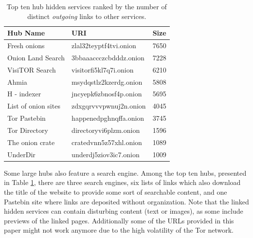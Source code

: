 \begin{table}[t]
    \begin{center}
        \caption{Top ten hub hidden services ranked by the number of distinct \emph{outgoing} links to other services.}
        \label{table:toptenout}
        \begin{tabular}{p{3cm} | p{3.5cm} | p{1cm}}
             \textbf{Hub Name} & \textbf{URI} & \textbf{Size} \\
             \hline
             \hline
            Fresh onions & zlal32teyptf4tvi.onion  &  7650\\
            \hline
            Onion Land Search & 3bbaaaccczcbdddz.onion  &  7228\\
            \hline
            VisiTOR Search & visitorfi5kl7q7i.onion  &  6210\\
            \hline
            Ahmia & msydqstlz2kzerdg.onion  &  5808\\
            \hline
            H - indexer & jncyepk6zbnosf4p.onion  &  5695\\
            \hline
            List of onion sites & zdxgqrvvvpwnuj2n.onion  &  4045\\
            \hline
            Tor Pastebin & happenedpghnqffa.onion  &  3745\\
            \hline
            Tor Directory & directoryvi6plzm.onion  &  1596\\
            \hline
            The onion crate & cratedvnn5z57xhl.onion  &  1089\\
            \hline
            UnderDir & underdj5ziov3ic7.onion  &  1009\\
        \end{tabular}
    \end{center}
\end{table}

Some large hubs also feature a search engine. Among the top ten hubs, presented in Table \ref{table:toptenout}, there are three search engines, six lists of links which also download the title of the website to provide some sort of searchable content, and one Pastebin site where links are deposited without organization. Note that the linked hidden services can contain disturbing content (text or images), as some include previews of the linked pages. Additionally some of the URLs provided in this paper might not work anymore due to the high volatility of the Tor network. %

